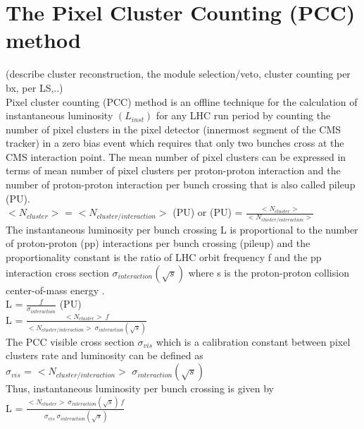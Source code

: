 \section{The Pixel Cluster Counting (PCC) method}
\label{sec:pcc}
(describe cluster reconstruction, the module selection/veto, cluster counting per bx, per LS,..) \\

Pixel cluster counting (PCC)  method is an offline technique for the calculation of instantaneous luminosity $(L_{inst})$ for any LHC run period by counting the number of pixel clusters in the pixel detector (innermost segment of the CMS tracker) in a zero bias event which requires that only two bunches cross at the CMS interaction point. The mean number of pixel clusters can be expressed in terms of mean number of pixel clusters per proton-proton interaction and the number of proton-proton interaction per bunch crossing that is also called pileup (PU). \\

$<N_{cluster}>$ = $<N_{cluster/interaction}>$ (PU)  or (PU) = $\frac{<N_{cluster}>}{<N_{cluster/interaction}>}$ \\

The instantaneous luminosity per bunch crossing L is proportional to the number of proton-proton (pp) interactions per bunch crossing (pileup) and the proportionality constant is the ratio of  LHC orbit frequency f and the pp interaction cross section $\sigma_{interaction}(\sqrt{s})$ where s is the proton-proton collision center-of-mass energy \cite{CMS-PAS-LUM-12-001}. \\

L = $\frac{f}{\sigma_{interaction}}$ (PU)  \\

L = $\frac{<N_{cluster}> \: f }{<N_{cluster/interaction}> \: \sigma_{interaction}(\sqrt{s})}$ \\

The PCC visible cross section $\sigma_{vis}$ which is a calibration constant between pixel clusters rate and luminosity can be defined as \\

$\sigma_{vis}$ = $<N_{cluster/interaction}>$  $\sigma_{interaction}(\sqrt{s})$ \\

\newpage Thus, instantaneous luminosity per bunch crossing is given by \\

L = $\frac{<N_{cluster}> \: \sigma_{interaction}(\sqrt{s}) \: f }{ \:\sigma_{vis} \: \sigma_{interaction}(\sqrt{s})}$ \\

